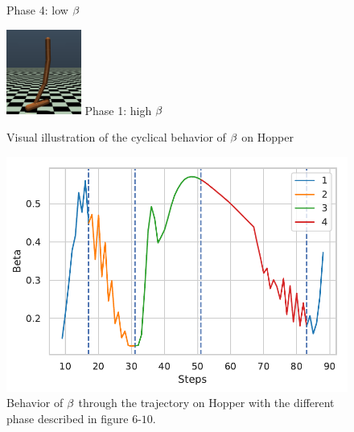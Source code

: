 \begin{figure}[h]
\begin{minipage}[b]{0.17\linewidth}
     Phase 4: low $\beta$
    \label{fig:phase_3}
    \end{minipage}
    \hspace{0.02cm}
    \begin{minipage}[b]{0.17\linewidth}
    \centering
    \includegraphics[width=\textwidth,height=2.8cm]{fig/phase_4.png}
    Phase 1: high $\beta$
    \label{fig:phase_4}
    \end{minipage}
    \caption{Visual illustration of the cyclical behavior of $\beta$ on Hopper}
    \label{fig:visual_hopper}
\end{figure}

\begin{figure}[!h]
    \centering
    \includegraphics[scale=0.5]{fig/beta_hopper.pdf}
    \caption{Behavior of $\beta$ through the trajectory on Hopper with the different phase described in figure $6$-$10$.}
    \label{fig:cyle_hopper}
\end{figure}

